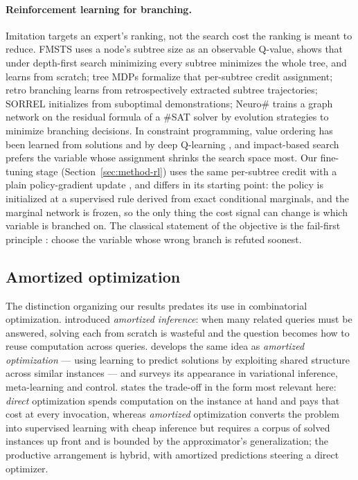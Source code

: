 \documentclass[final,5p,times,twocolumn]{elsarticle}
\begin{document}
\paragraph{Reinforcement learning for branching.} Imitation targets an expert's ranking, not the search cost the ranking is meant to reduce. FMSTS \citep{etheve2020reinforcement} uses a node's subtree size as an observable Q-value, shows that under depth-first search minimizing every subtree minimizes the whole tree, and learns from scratch; tree MDPs \citep{scavuzzo2022learning} formalize that per-subtree credit assignment; retro branching \citep{parsonson2023reinforcement} learns from retrospectively extracted subtree trajectories; SORREL \citep{sorrel2025} initializes from suboptimal demonstrations; Neuro\# \citep{vaezipoor2021learning} trains a graph network on the residual formula of a \#SAT solver by evolution strategies to minimize branching decisions. In constraint programming, value ordering has been learned from solutions \citep{chu2015learning} and by deep Q-learning \citep{cappart2021combining}, and impact-based search \citep{refalo2004impact} prefers the variable whose assignment shrinks the search space most. Our fine-tuning stage (Section~\ref{sec:method-rl}) uses the same per-subtree credit with a plain policy-gradient update \citep{williams1992simple}, and differs in its starting point: the policy is initialized at a supervised rule derived from exact conditional marginals, and the marginal network is frozen, so the only thing the cost signal can change is which variable is branched on. The classical statement of the objective is the fail-first principle \citep{haralick1980increasing}: choose the variable whose wrong branch is refuted soonest.

\subsection{Amortized optimization}

The distinction organizing our results predates its use in combinatorial optimization. \citet{gershman2014amortized} introduced \emph{amortized inference}: when many related queries must be answered, solving each from scratch is wasteful and the question becomes how to reuse computation across queries. \citet{amos2023tutorial} develops the same idea as \emph{amortized optimization} --- using learning to predict solutions by exploiting shared structure across similar instances --- and surveys its appearance in variational inference, meta-learning and control. \citet{millidge2022deconfusing} states the trade-off in the form most relevant here: \emph{direct} optimization spends computation on the instance at hand and pays that cost at every invocation, whereas \emph{amortized} optimization converts the problem into supervised learning with cheap inference but requires a corpus of solved instances up front and is bounded by the approximator's generalization; the productive arrangement is hybrid, with amortized predictions steering a direct optimizer.
\end{document}
